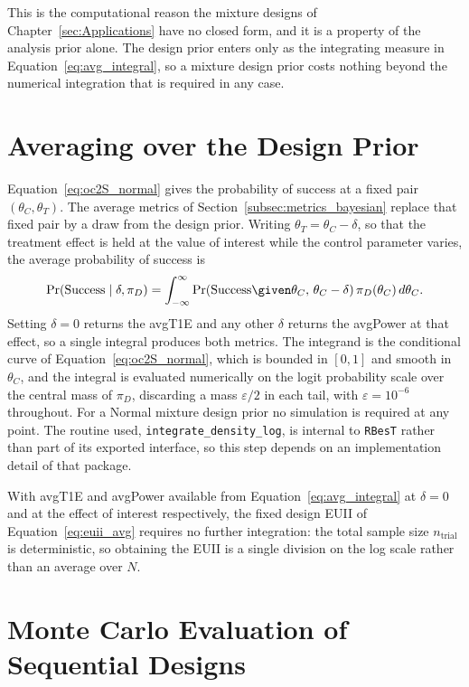 This is the computational reason the mixture designs of Chapter~\ref{sec:Applications} have no
closed form, and it is a property of the analysis prior alone. The design prior enters only as the
integrating measure in Equation~\eqref{eq:avg_integral}, so a mixture design prior costs nothing
beyond the numerical integration that is required in any case.

\section{Averaging over the Design Prior}

Equation~\eqref{eq:oc2S_normal} gives the probability of success at a fixed pair $(\theta_C, \theta_T)$.
The average metrics of Section~\ref{subsec:metrics_bayesian} replace that fixed pair by a draw from the
design prior. Writing $\theta_T = \theta_C - \delta$, so that the treatment effect is held at the value of
interest while the control parameter varies, the average probability of success is
\begin{equation} \label{eq:avg_integral}
  \Pr(\text{Success} \mid \delta, \pi_D)
  = \int_{-\infty}^{\infty} \Pr\!\left(\text{Success} \given \theta_C,\, \theta_C - \delta\right)
    \pi_D(\theta_C)\, d\theta_C .
\end{equation}
Setting $\delta = 0$ returns the avgT1E and any other $\delta$ returns the avgPower at that effect, so a
single integral produces both metrics. The integrand is the conditional curve of
Equation~\eqref{eq:oc2S_normal}, which is bounded in $[0,1]$ and smooth in $\theta_C$, and the integral is
evaluated numerically on the logit probability scale over the central mass of $\pi_D$, discarding a mass
$\varepsilon/2$ in each tail, with $\varepsilon = 10^{-6}$ throughout. For a Normal mixture design prior no
simulation is required at any point. The routine used, \texttt{integrate\_density\_log}, is internal to
\texttt{RBesT} rather than part of its exported interface, so this step depends on an implementation detail
of that package.

With avgT1E and avgPower available from Equation~\eqref{eq:avg_integral} at $\delta = 0$ and at the effect of
interest respectively, the fixed design EUII of Equation~\eqref{eq:euii_avg} requires no further integration:
the total sample size $n_{\text{trial}}$ is deterministic, so obtaining the EUII is a single division on the
log scale rather than an average over $N$.

\section{Monte Carlo Evaluation of Sequential Designs}

